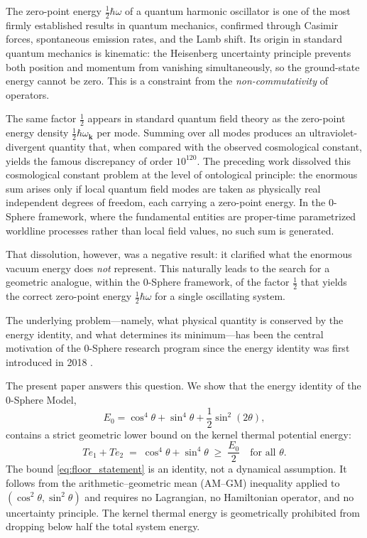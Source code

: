 \documentclass[%
 reprint, amsmath,amssymb, aps, prb, ]{revtex4-2}
\numberwithin{equation}{section}
\begin{document}
The zero-point energy $\tfrac{1}{2}\hbar\omega$ of a quantum harmonic oscillator is one of the most firmly established results in quantum mechanics, confirmed through Casimir forces, spontaneous emission rates, and the Lamb shift. Its origin in standard quantum mechanics is kinematic: the Heisenberg uncertainty principle prevents both position and momentum from vanishing simultaneously, so the ground-state energy cannot be zero. This is a constraint from the \emph{non-commutativity} of operators.

The same factor $\tfrac{1}{2}$ appears in standard quantum field theory as the zero-point energy density $\tfrac{1}{2}\hbar\omega_\mathbf{k}$ per mode. Summing over all modes produces an ultraviolet-divergent quantity that, when compared with the observed cosmological constant, yields the famous discrepancy of order $10^{120}$. The preceding work \cite{hanamura2026_32} dissolved this cosmological constant problem at the level of ontological principle: the enormous sum arises only if local quantum field modes are taken as physically real independent degrees of freedom, each carrying a zero-point energy. In the 0-Sphere framework, where the fundamental entities are proper-time parametrized worldline processes rather than local field values, no such sum is generated.

That dissolution, however, was a negative result: it clarified what the enormous vacuum energy does \emph{not} represent. This naturally leads to the search for a geometric analogue, within the 0-Sphere framework, of the factor $\tfrac{1}{2}$ that yields the correct zero-point energy $\tfrac{1}{2}\hbar\omega$ for a single oscillating system.

The underlying problem—namely, what physical quantity is conserved by the energy identity, and what determines its minimum—has been the central motivation of the 0-Sphere research program since the energy identity was first introduced in 2018 \cite{hanamura2018}.

The present paper answers this question. We show that the energy identity of the 0-Sphere Model,
\begin{equation}
E_0 = \cos^4\theta + \sin^4\theta + \frac{1}{2}\sin^2(2\theta),
\label{eq:energy}
\end{equation}
contains a strict geometric lower bound on the kernel thermal potential energy:
\begin{equation}
Te_1 + Te_2 \;=\; \cos^4\theta + \sin^4\theta \;\geq\; \frac{E_0}{2}
\quad \text{for all } \theta.
\label{eq:floor_statement}
\end{equation}
The bound \eqref{eq:floor_statement} is an identity, not a dynamical assumption. It follows from the arithmetic--geometric mean (AM--GM) inequality applied to $(\cos^2\theta, \sin^2\theta)$ and requires no Lagrangian, no Hamiltonian operator, and no uncertainty principle. The kernel thermal energy is geometrically prohibited from dropping below half the total system energy.
\end{document}
